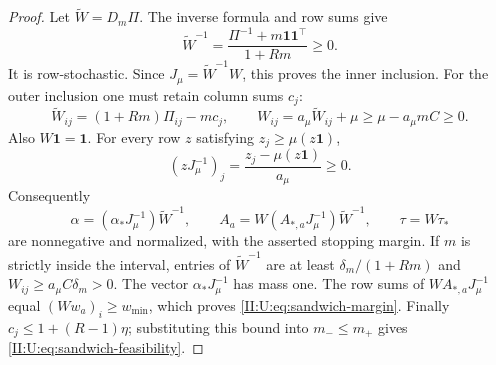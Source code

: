 \begin{proof}
Let $\widetilde W=D_m\Pi$. The inverse formula and row sums give
\[
 \widetilde W^{-1}=\frac{\Pi^{-1}+m\mathbf1\mathbf1^\top}{1+Rm}\ge0.
\]
It is row-stochastic. Since $J_\mu=\widetilde W^{-1}W$, this proves
the inner inclusion. For the outer inclusion one must retain column
sums $c_j$:
\[
 \widetilde W_{ij}=(1+Rm)\Pi_{ij}-mc_j,\qquad
 W_{ij}=a_\mu\widetilde W_{ij}+\mu
       \ge\mu-a_\mu m C\ge0.
\]
Also $W\mathbf1=\mathbf1$. For every row $z$ satisfying
$z_j\ge\mu(z\mathbf1)$,
\[
 (zJ_\mu^{-1})_j=\frac{z_j-\mu(z\mathbf1)}{a_\mu}\ge0.
\]
Consequently
\[
 \alpha=(\alpha_*J_\mu^{-1})\widetilde W^{-1},\qquad
 A_a=W(A_{*,a}J_\mu^{-1})\widetilde W^{-1},\qquad
 \tau=W\tau_*
\]
are nonnegative and normalized, with the asserted stopping margin.
If $m$ is strictly inside the interval, entries of $\widetilde W^{-1}$
are at least $\delta_m/(1+Rm)$ and $W_{ij}\ge a_\mu C\delta_m>0$.
The vector $\alpha_*J_\mu^{-1}$ has mass one. The row sums of
$W A_{*,a}J_\mu^{-1}$ equal $(Ww_a)_i\ge w_{\min}$, which proves
\eqref{II:U:eq:sandwich-margin}. Finally $c_j\le1+(R-1)\eta$; substituting
this bound into $m_-\le m_+$ gives \eqref{II:U:eq:sandwich-feasibility}.
\end{proof}
